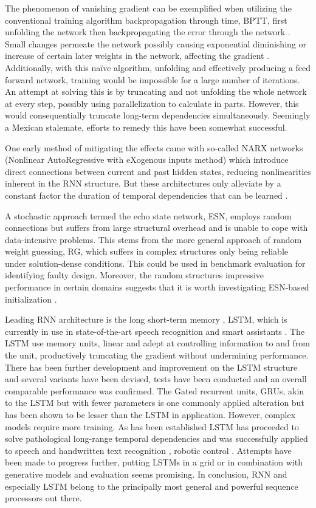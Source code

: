 The phenomenon of vanishing gradient can be exemplified when utilizing the conventional training algorithm backpropagation through time, BPTT, first unfolding the network then backpropagating the error through the network \cite{DRNNS}. Small changes permeate the network possibly causing exponential diminishing or increase of certain later weights in the network, affecting the gradient \cite{field}. Additionally, with this naïve algorithm, unfolding and effectively producing a feed forward network, training would be impossible for a large number of iterations. An attempt at solving this is by truncating and not unfolding the whole network at every step, possibly using parallelization to calculate in parts. However, this would consequentially truncate long-term dependencies simultaneously. Seemingly a Mexican stalemate, efforts to remedy this have been somewhat successful. 

One early method of mitigating the effects came with so-called NARX networks (Nonlinear AutoRegressive with eXogenous inputs method) \cite{DRNNS} which introduce direct connections between current and past hidden states, reducing nonlinearities inherent in the RNN structure. But these architectures only alleviate by a constant factor the duration of temporal dependencies that can be learned \cite{suts}.

A stochastic approach termed the echo state network, ESN, employs random connections but suffers from large structural overhead and is unable to cope with data-intensive problems. This stems from the more general approach of random weight guessing, RG, which suffers in complex structures only being reliable under solution-dense conditions. This could be used in benchmark evaluation for identifying faulty design. Moreover, the random structures impressive performance in certain domains suggests that it is worth investigating ESN-based initialization \cite{suts}. 

Leading RNN architecture is the long short-term memory \cite{LSTM}, LSTM, which is currently in use in state-of-the-art speech recognition and smart assistants \cite{Apple}. The LSTM use memory units, linear and adept at controlling information to and from the unit, productively truncating the gradient without undermining performance. There has been further development and improvement on the LSTM structure and several variants have been devised, tests have been conducted and an overall comparable performance was confirmed\cite{Greff}. The Gated recurrent units, GRUs, akin to the LSTM but with fewer parameters is one commonly applied alteration but has been shown to be lesser than the LSTM in application. However, complex models require more training. As has been established LSTM has proceeded to solve pathological long-range temporal dependencies and was successfully applied to speech and handwritten text recognition \cite{gs, gas}, robotic control \cite{mayer}. Attempts have been made to progress further, putting LSTMs in a grid\cite{ka} or in combination with generative models and evaluation seems promising\cite{gr, ch, bo}. In conclusion, RNN and especially LSTM belong to the principally most general and powerful sequence processors out there.

